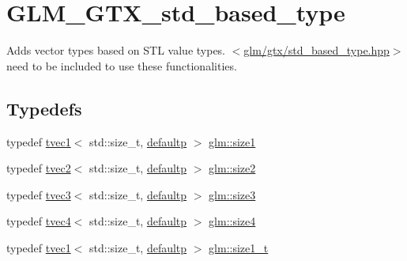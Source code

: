 \hypertarget{group__gtx__std__based__type}{}\section{G\+L\+M\+\_\+\+G\+T\+X\+\_\+std\+\_\+based\+\_\+type}
\label{group__gtx__std__based__type}


Adds vector types based on S\+TL value types. $<$\mbox{\hyperlink{std__based__type_8hpp}{glm/gtx/std\+\_\+based\+\_\+type.\+hpp}}$>$ need to be included to use these functionalities.  


\subsection*{Typedefs}
\begin{DoxyCompactItemize}
\item 
typedef \mbox{\hyperlink{structglm_1_1tvec1}{tvec1}}$<$ std\+::size\+\_\+t, \mbox{\hyperlink{namespaceglm_a0f04f086094c747d227af4425893f545a9d21ccd8b5a009ec7eb7677befc3bf51}{defaultp}} $>$ \mbox{\hyperlink{group__gtx__std__based__type_ga3550330d27cef40f7694130b501be73a}{glm\+::size1}}
\item 
typedef \mbox{\hyperlink{structglm_1_1tvec2}{tvec2}}$<$ std\+::size\+\_\+t, \mbox{\hyperlink{namespaceglm_a0f04f086094c747d227af4425893f545a9d21ccd8b5a009ec7eb7677befc3bf51}{defaultp}} $>$ \mbox{\hyperlink{group__gtx__std__based__type_gab8b434ee2ba109726915e977c6aca22a}{glm\+::size2}}
\item 
typedef \mbox{\hyperlink{structglm_1_1tvec3}{tvec3}}$<$ std\+::size\+\_\+t, \mbox{\hyperlink{namespaceglm_a0f04f086094c747d227af4425893f545a9d21ccd8b5a009ec7eb7677befc3bf51}{defaultp}} $>$ \mbox{\hyperlink{group__gtx__std__based__type_gacf3e47fc09ad812f100e13442919fc79}{glm\+::size3}}
\item 
typedef \mbox{\hyperlink{structglm_1_1tvec4}{tvec4}}$<$ std\+::size\+\_\+t, \mbox{\hyperlink{namespaceglm_a0f04f086094c747d227af4425893f545a9d21ccd8b5a009ec7eb7677befc3bf51}{defaultp}} $>$ \mbox{\hyperlink{group__gtx__std__based__type_ga66a39603f01a37444de3adb28c021e79}{glm\+::size4}}
\item 
typedef \mbox{\hyperlink{structglm_1_1tvec1}{tvec1}}$<$ std\+::size\+\_\+t, \mbox{\hyperlink{namespaceglm_a0f04f086094c747d227af4425893f545a9d21ccd8b5a009ec7eb7677befc3bf51}{defaultp}} $>$ \mbox{\hyperlink{group__gtx__std__based__type_ga9a9525491009d0df7bcc964b1e2e5745}{glm\+::size1\+\_\+t}}
\item 

\end{DoxyCompactItemize}

